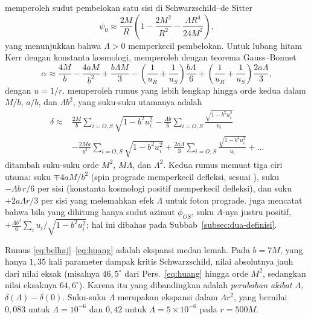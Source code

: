 \documentclass[11pt,a4paper]{article}
\begin{document}
\citet{rindler2007contribution} memperoleh sudut pembelokan satu sisi di Schwarzschild--de Sitter
\begin{equation}
  \psi_0 \approx \frac{2M}{R}\left(1 - \frac{2M^2}{R^2} - \frac{\Lambda R^4}{24M^2}\right),
\end{equation}
yang menunjukkan bahwa $\Lambda > 0$ memperkecil pembelokan. Untuk lubang hitam Kerr dengan konstanta
kosmologi, \citet[Pers.~5.1]{belhaj2022light} memperoleh dengan teorema Gauss--Bonnet
\begin{equation}
  \alpha \approx \frac{4M}{b} - \frac{4aM}{b^2} + \frac{b\Lambda M}{3}
  - \left(\frac{1}{u_R} + \frac{1}{u_S}\right)\frac{b\Lambda}{6}
  + \left(\frac{1}{u_R} + \frac{1}{u_S}\right)\frac{2a\Lambda}{3},
  \label{eq:belhaj}
\end{equation}
dengan $u = 1/r$. \citet[Pers.~24]{huang2025influence} memperoleh rumus yang lebih lengkap hingga orde
kedua dalam $M/b$, $a/b$, dan $\Lambda b^2$, yang suku-suku utamanya adalah
\begin{equation}
  \begin{split}
    \delta \approx{}& \frac{2M}{b}\sum_{i=O,S}\sqrt{1-b^2u_i^2}
    - \frac{\Lambda b}{6}\sum_{i=O,S}\frac{\sqrt{1-b^2u_i^2}}{u_i} \\
    & - \frac{2Ma}{b^2}\sum_{i=O,S}\sqrt{1-b^2u_i^2}
    + \frac{2a\Lambda}{3}\sum_{i=O,S}\frac{\sqrt{1-b^2u_i^2}}{u_i} + \dots
  \end{split}
  \label{eq:huang}
\end{equation}
ditambah suku-suku orde $M^2$, $M\Lambda$, dan $\Lambda^2$. Kedua rumus memuat tiga ciri utama: suku
$\mp 4aM/b^2$ (spin prograde memperkecil defleksi, sesuai \citealp{jusufi2018gravitational}), suku
$-\Lambda b\,r/6$ per sisi (konstanta kosmologi positif memperkecil defleksi), dan suku $+2a\Lambda r/3$
per sisi yang melemahkan efek $\Lambda$ untuk foton prograde. \citet[\S\,4.1.2]{huang2025influence} juga
mencatat bahwa bila yang dihitung hanya sudut azimut $\phi_{OS}$, suku $\Lambda$-nya justru positif,
$+\tfrac{\Lambda b^3}{6}\sum_i u_i/\sqrt{1-b^2u_i^2}$; hal ini dibahas pada
Subbab~\ref{subsec:dua-definisi}.

Rumus \eqref{eq:belhaj}--\eqref{eq:huang} adalah ekspansi medan lemah. Pada $b = 7M$, yang hanya
$1{,}35$ kali parameter dampak kritis Schwarzschild, nilai absolutnya jauh dari nilai eksak (misalnya
$46{,}5^\circ$ dari Pers.~\eqref{eq:huang} hingga orde $M^2$, sedangkan nilai eksaknya $64{,}6^\circ$).
Karena itu yang dibandingkan adalah \emph{perubahan akibat $\Lambda$}, $\delta(\Lambda) - \delta(0)$.
Suku-suku $\Lambda$ merupakan ekspansi dalam $\Lambda r^2$, yang bernilai $0{,}083$ untuk
$\Lambda = 10^{-6}$ dan $0{,}42$ untuk $\Lambda = 5\times10^{-6}$ pada $r = 500M$.
\end{document}
